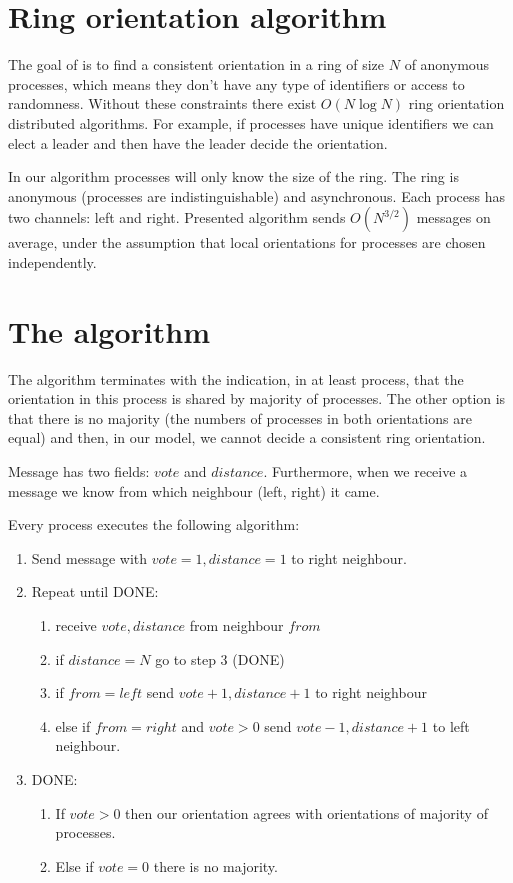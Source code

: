 \documentclass[a4paper,12pt]{article}
\begin{document}
\section{Ring orientation algorithm}
The goal of \cite{10.1007/BFb0019813} is to find a consistent orientation in a ring of size $N$ of anonymous processes, which means they don't have any type of identifiers or access to randomness. Without these constraints there exist $O(N\log N)$ ring orientation distributed algorithms. For example, if processes have unique identifiers we can elect a leader and then have the leader decide the orientation.

In our algorithm processes will only know the size of the ring. The ring is anonymous (processes are indistinguishable) and asynchronous. Each process has two channels: left and right. Presented algorithm sends $O(N^{3/2})$ messages on average, under the assumption that local orientations for processes are chosen independently.

\section{The algorithm}
The algorithm terminates with the indication, in at least process, that the orientation in this process is shared by majority of processes. The other option is that there is no majority (the numbers of processes in both orientations are equal) and then, in our model, we cannot decide a consistent ring orientation.

Message has two fields: $vote$ and $distance$. Furthermore, when we receive a message we know from which neighbour (left, right) it came.

Every process executes the following algorithm:
\begin{enumerate}
    \item Send message with $vote = 1, distance = 1$ to right neighbour. 
    \item Repeat until DONE:
    \begin{enumerate}
        \item receive $vote, distance$ from neighbour $from$
        \item if $distance = N$ go to step 3 (DONE)
        \item if $from = left$ send $vote+1, distance+1$ to right neighbour
        \item else if $from = right$ and $vote > 0$ send $vote-1, distance+1$ to left neighbour.
    \end{enumerate}
    \item DONE: 
    \begin{enumerate}
        \item If $vote > 0$ then our orientation agrees with orientations of majority of processes.
        \item Else if $vote = 0$ there is no majority.
    \end{enumerate}
\end{enumerate}
\end{document}
